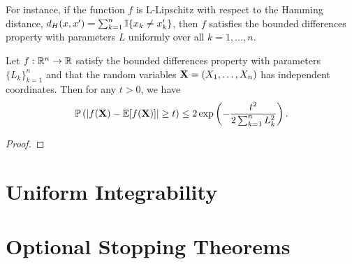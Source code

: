 For instance, if the function \(f\) is L-Lipschitz with respect to the Hamming distance, \(d_{H}(x,x')=\sum_{k=1}^{n}\mathbb{I}\{x_{k}\neq x_{k}'\}\), then  \(f\) satisfies the bounded differences property with parameters \(L\) uniformly over all \(k=1,\ldots,n\).

\begin{theorem}\label{thm:bounded-differences}
	Let \(f:\mathbb{R}^{n}\to\mathbb{R}\) satisfy the bounded differences property with parameters \(\{L_{k}\}_{k=1}^{n}\) and that the random variables \(\mathbf{X}=(X_{1},\ldots,X_{n})\) has independent coordinates. Then for any \(t>0\), we have
	\begin{equation*}
		\mathbb{P}\left(\left|f(\mathbf{X})-\mathbb{E}[f(\mathbf{X})]\right|\geq t\right)\leq 2\exp\left(-\frac{t^{2}}{2\sum_{k=1}^{n}L_{k}^{2}}\right).
	\end{equation*}
\end{theorem}
\begin{proof}

\end{proof}

\begin{example}

\end{example}

\begin{example}[U-statistics]

\end{example}

\begin{example}

\end{example}

\begin{theorem}

\end{theorem}

\begin{theorem}

\end{theorem}

\section{Uniform Integrability}

\section{Optional Stopping Theorems}
